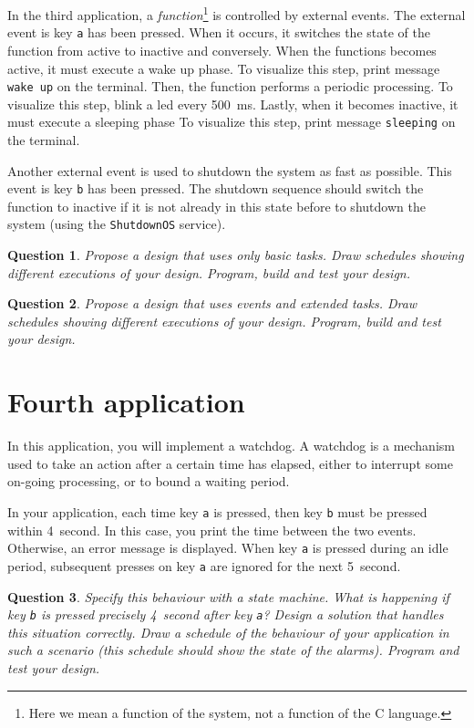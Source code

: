 \documentclass[11pt]{report}
\newtheorem{ex}{Question}
\begin{document}
In the third application, a \textit{function}\footnote{Here we mean a function of the system, not a function of the C language.} is controlled by external events.
The external event is key \verb-a- has been pressed.
When it occurs, it switches the state of the function from active to inactive and conversely.
When the functions becomes active, it must execute a wake up phase.
To visualize this step, print message \verb-wake up- on the terminal.
Then, the function performs a periodic processing.
To visualize this step, blink a led every \SI{500}{\milli\second}.
Lastly, when it becomes inactive, it must execute a sleeping phase
To visualize this step, print message \verb-sleeping- on the terminal.

Another external event is used to shutdown the system as fast as possible.
This event is key \verb-b- has been pressed.
The shutdown sequence should switch the function to inactive if it is not already in this state before to shutdown the system (using the \texttt{ShutdownOS} service).

\begin{ex}
  Propose a design that uses only basic tasks.
  Draw schedules showing different executions of your design.
  Program, build and test your design.
\end{ex}

\begin{ex}
  Propose a design that uses events and extended tasks.
  Draw schedules showing different executions of your design.
  Program, build and test your design.
\end{ex}

\section{Fourth application}

In this application, you will implement a watchdog.
A watchdog is a mechanism used to take an action after a certain time has elapsed, either to interrupt some on-going processing, or to bound a waiting period.

In your application, each time key \verb-a- is pressed, then key \verb-b- must be pressed within \SI{4}{second}.
In this case, you print the time between the two events.
Otherwise, an error message is displayed.
When key \verb-a- is pressed during an idle period, subsequent presses on key \verb-a- are ignored for the next \SI{5}{second}.

\begin{ex}
  Specify this behaviour with a state machine.
  What is happening if key \verb-b- is pressed precisely \SI{4}{second} after key \verb-a-?
  Design a solution that handles this situation correctly.
  Draw a schedule of the behaviour of your application in such a scenario (this schedule should show the state of the alarms).
  Program and test your design.
\end{ex}
\end{document}
